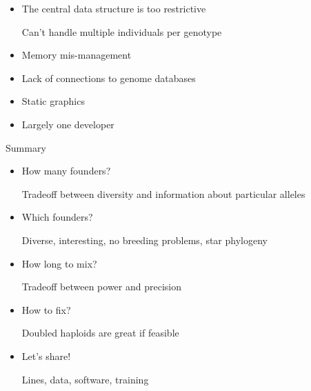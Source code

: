\documentclass[12pt]{article}
\newcommand{\headsize}{\fontsize{35}{35} \selectfont}
\newcommand{\smallsize}{\fontsize{25}{30} \selectfont}
\newcommand{\smallersize}{\fontsize{20}{25} \selectfont}
\begin{document}
{\begin{minipage}{10in}
\begin{itemize}
\item The central data structure is too restrictive

{\smallersize \color{myblue} Can't handle multiple individuals per genotype}

\item Memory mis-management

\item Lack of connections to genome databases

\item Static graphics

\item Largely one developer

\end{itemize}
\end{minipage}


\newpage

\headsize \color{myyellow}
\hfill \begin{minipage}{5.75in}
\centering
Summary
\end{minipage}

\vspace{15mm}

\color{mywhite}
\smallsize

\hfill \begin{minipage}{10in}
\begin{itemize}
\itemsep24pt
\item How many founders?

{\smallersize \color{myblue} Tradeoff between {\color{mypink} diversity} and information about
  {\color{mypink} particular alleles}}

\item Which founders?

{\smallersize \color{myblue} Diverse, interesting, no breeding
  problems, star phylogeny}

\item How long to mix?

{\smallersize \color{myblue} Tradeoff between {\color{mypink} power}
  and {\color{mypink} precision}}

\item How to fix?

{\smallersize \color{myblue} Doubled haploids are great if feasible}

\item Let's share!

{\smallersize \color{myblue} Lines, data, software, training}


\end{itemize}
\end{minipage}


}
\end{document}
